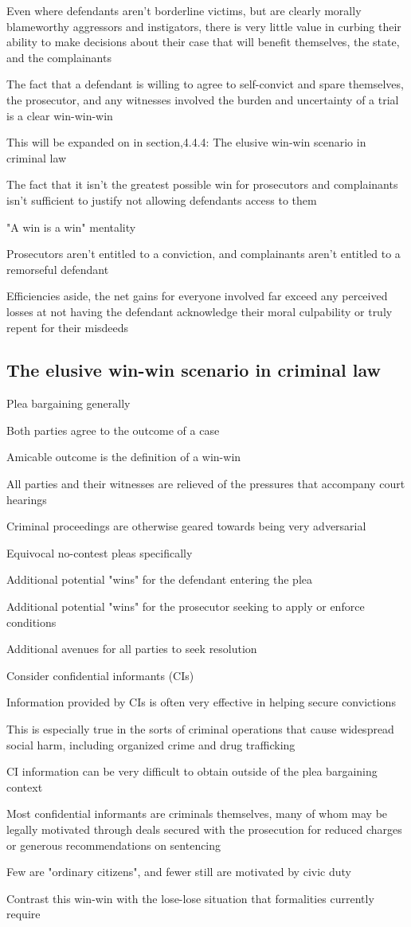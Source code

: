Even where defendants aren't borderline victims, but are clearly morally blameworthy aggressors and instigators, there is very little value in curbing their ability to make decisions about their case that will benefit themselves, the state, and the complainants

The fact that a defendant is willing to agree to self-convict and spare themselves, the prosecutor, and any witnesses involved the burden and uncertainty of a trial is a clear win-win-win

This will be expanded on in section,4.4.4: The elusive win-win scenario in criminal law

The fact that it isn't the greatest possible win for prosecutors and complainants isn't sufficient to justify not allowing defendants access to them

"A win is a win" mentality

Prosecutors aren't entitled to a conviction, and complainants aren't entitled to a remorseful defendant

Efficiencies aside, the net gains for everyone involved far exceed any perceived losses at not having the defendant acknowledge their moral culpability or truly repent for their misdeeds

\subsection{The elusive win-win scenario in criminal law}

Plea bargaining generally

Both parties agree to the outcome of a case

Amicable outcome is the definition of a win-win

All parties and their witnesses are relieved of the pressures that accompany court hearings

Criminal proceedings are otherwise geared towards being very adversarial

Equivocal no-contest pleas specifically

Additional potential "wins" for the defendant entering the plea

Additional potential "wins" for the prosecutor seeking to apply or enforce conditions

Additional avenues for all parties to seek resolution

Consider confidential informants (CIs)

Information provided by CIs is often very effective in helping secure convictions

This is especially true in the sorts of criminal operations that cause widespread social harm, including organized crime and drug trafficking

CI information can be very difficult to obtain outside of the plea bargaining context

Most confidential informants are criminals themselves, many of whom may be legally motivated through deals secured with the prosecution for reduced charges or generous recommendations on sentencing

Few are "ordinary citizens", and fewer still are motivated by civic duty

Contrast this win-win with the lose-lose situation that formalities currently require
